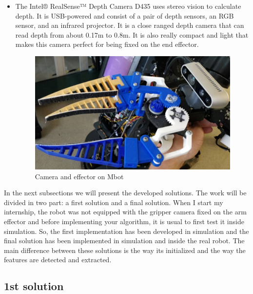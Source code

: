 \begin{itemize}
\newpage
    \item 
The Intel® RealSense™ Depth Camera D435 uses stereo vision to calculate depth. It is USB-powered and consist of a pair of depth sensors, an RGB sensor, and an infrared projector. It is a close ranged depth camera that can read depth from about 0.17m to 0.8m. It is also really compact and light that makes this camera perfect for being fixed on the end effector.
\begin{figure} [!ht]
    \centering
    \includegraphics[width=0.5\linewidth]{images/camera_and_gripper_real.png}
    \caption{Camera and effector on Mbot}
    \label{pict:camera_gripper}
\end{figure}
\end{itemize}

In the next subsections we will present the developed solutions. The work will be divided in two part: a first solution and a final solution. When I start my internship, the robot was not equipped with the gripper camera fixed on the arm effector and before implementing your algorithm, it is usual to first test it inside simulation. So, the first implementation has been developed in simulation and the final solution has been implemented in simulation and inside the real robot. The main difference between these solutions is the way its initialized and the way the features are detected and extracted.

\subsection{1st solution}
  
